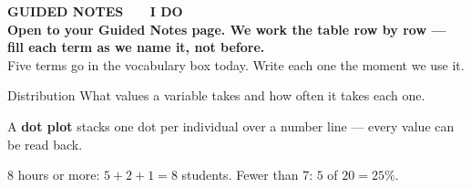 \documentclass[aspectratio=169, 11pt]{beamer}
\begin{document}
{
\begin{frame}[plain]
  \vspace{1.8cm}\hspace{0.8cm}%
  \begin{minipage}{0.86\textwidth}
    {\color{goldacc}\bfseries\small GUIDED NOTES \ \textbullet\ \ I DO}\\[0.7cm]
    {\color{white}\bfseries\Large Open to your Guided Notes page. We work the table row by
    row --- fill each term as we name it, not before.}\\[0.9cm]
    {\color{frostmid}\small Five terms go in the vocabulary box today. Write each one the
    moment we use it.}
  \end{minipage}
\end{frame}
}

\begin{frame}[t, plain]
  \begin{block}{Distribution}
    What values a variable takes and how often it takes each one.
  \end{block}
  \vspace{2pt}
  A \textbf{dot plot} stacks one dot per individual over a number line --- every value can be
  read back.
  \begin{center}
  \end{center}
  {\small 8 hours or more: $5+2+1 = 8$ students. \quad Fewer than 7: $5$ of $20 = 25\%$.}
\end{frame}
\end{document}
